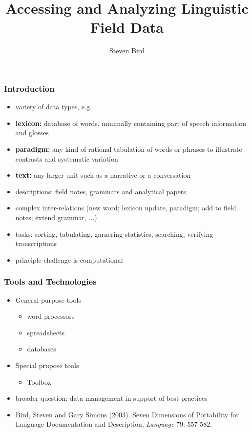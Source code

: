 \documentclass{beamer}             %
\title{Accessing and Analyzing Linguistic Field Data}
\author{Steven Bird}
\institute{
  University of Melbourne, AUSTRALIA
}
\begin{document}
\begin{frame}
  \titlepage
\end{frame}


\begin{frame}
  \frametitle{Introduction}
  \begin{itemize}
  \item variety of data types, e.g.
  \item \textbf{lexicon:} database of words, minimally containing part
    of speech information and glosses
  \item \textbf{paradigm:} any kind of rational
    tabulation of words or phrases to illustrate contrasts and systematic
    variation
  \item \textbf{text:} any larger unit such as a narrative or a
    conversation
  \item descriptions: field notes, grammars and analytical papers
  \item complex inter-relations (new word; lexicon update, paradigm;
    add to field notes; extend grammar, ...)
  \item tasks: sorting, tabulating, garnering statistics, searching,
  verifying transcriptions
  \item principle challenge is computational
  \end{itemize}

\end{frame}

\begin{frame}
\frametitle{Tools and Technologies}
\begin{itemize}
\item General-purpose tools
  \begin{itemize}
  \item word processors
  \item spreadsheets
  \item databases
  \end{itemize}
\item Special prupose tools
  \begin{itemize}
  \item Toolbox
  \end{itemize}
\item broader question: data management in support of best practices
\item Bird, Steven and Gary Simons (2003).  Seven Dimensions of Portability
    for Language Documentation and Description, \textit{Language} 79: 557-582.
\end{itemize}
\end{frame}
\end{document}
